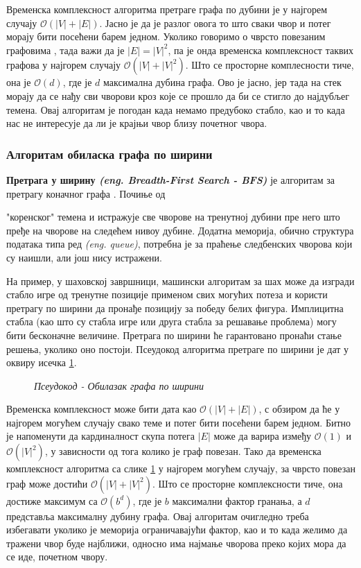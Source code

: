 \par
Временска комплексност алгоритма претраге графа по дубини је у најгорем случају $\mathcal{O}(|V| + |E|)$. Јасно је да је разлог овога то што сваки чвор и потег морају бити посећени барем једном. Уколико говоримо о чврсто повезаним графовима \cite{graphs2}, тада важи да је $|E| = |V|^2$, па је онда временска комплексност таквих графова у најгорем случају $\mathcal{O}(|V| + |V|^2)$. Што се просторне комплесности тиче, она је $\mathcal{O}(d)$, где је $d$ максимална дубина графа. Ово је јасно, јер тада на стек морају да се нађу сви чворови кроз које се прошло да би се стигло до најдубљег темена. Овај алгоритам је погодан када немамо предубоко стабло, као и то када нас не интересује да ли је крајњи чвор близу почетног чвора.

\subsubsection{Алгоритам обиласка графа по ширини}
\textbf{Претрага у ширину \textit{(eng. Breadth-First Search - BFS)}} је алгоритам за претрагу коначног графа \cite{graph-algorithms}. Почиње од \par{"коренског"} темена и истражује све чворове на тренутној дубини пре него што пређе на чворове на следећем нивоу дубине. Додатна меморија, обично структура података типа ред \textit{(eng. queue)}, потребна је за праћење следбенских чворова који су наишли, али још нису истражени.

\par
На пример, у шаховској завршници, машински алгоритам за шах може да изгради стабло игре од тренутне позиције применом свих могућих потеза и користи претрагу по ширини да пронађе позицију за победу белих фигура. Имплицитна стабла (као што су стабла игре или друга стабла за решавање проблема) могу бити бесконачне величине. Претрага по ширини ће гарантовано пронаћи стање решења, уколико оно постоји. Псеудокод алгоритма претраге по ширини је дат у оквиру исечка \ref{pseudocode:algorithm-bfs-traversal-pseudo}.

\begin{figure}[h!]
\centering

\caption{\textit{Псеудокод - Обилазак графа по ширини}}
\label{pseudocode:algorithm-bfs-traversal-pseudo}
\end{figure}

\par
Временска комплексност може бити дата као $\mathcal{O}(|V| + |E|)$, с обзиром да ће у најгорем могућем случају свако теме и потег бити посећени барем једном. Битно је напоменути да кардиналност скупа потега $|E|$ може да варира између $\mathcal{O}(1)$ и $\mathcal{O}(|V|^2)$, у зависности од тога колико је граф повезан. Тако да временска комплексност алгоритма са слике \ref{pseudocode:algorithm-bfs-traversal-pseudo} у најгорем могућем случају, за чврсто повезан граф може достићи $\mathcal{O}(|V|+|V|^2)$. Што се просторне комплексности тиче, она достиже максимум са $\mathcal{O}(b^d)$, где је $b$ максимални фактор гранања, а $d$ представља максималну дубину графа. Овај алгоритам очигледно треба избегавати уколико је меморија ограничавајући фактор, као и то када желимо да тражени чвор буде најближи, односно има најмање чворова преко којих мора да се иде, почетном чвору. 